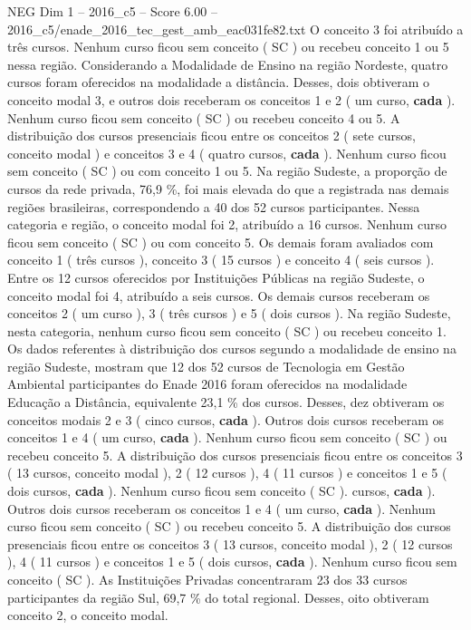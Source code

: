 \begin{textsample}{NEG Dim 1 – 2016\_c5 – Score 6.00 – 2016\_c5/enade\_2016\_tec\_gest\_amb\_eac031fe82.txt}
O conceito 3 foi atribuído a três cursos.
Nenhum curso ficou sem conceito ( SC ) ou recebeu conceito 1 ou 5 nessa região.
Considerando a Modalidade de Ensino na região Nordeste, quatro cursos foram oferecidos na modalidade a distância.
Desses, dois obtiveram o conceito modal 3, e outros dois receberam os conceitos 1 e 2 ( um curso, \textbf{cada} ).
Nenhum curso ficou sem conceito ( SC ) ou recebeu conceito 4 ou 5.
A distribuição dos cursos presenciais ficou entre os conceitos 2 ( sete cursos, conceito modal ) e conceitos 3 e 4 ( quatro cursos, \textbf{cada} ).
Nenhum curso ficou sem conceito ( SC ) ou com conceito 1 ou 5.
Na região Sudeste, a proporção de cursos da rede privada, 76,9 \%, foi mais elevada do que a registrada nas demais regiões brasileiras, correspondendo a 40 dos 52 cursos participantes.
Nessa categoria e região, o conceito modal foi 2, atribuído a 16 cursos.
Nenhum curso ficou sem conceito ( SC ) ou com conceito 5.
Os demais foram avaliados com conceito 1 ( três cursos ), conceito 3 ( 15 cursos ) e conceito 4 ( seis cursos ).
Entre os 12 cursos oferecidos por Instituições Públicas na região Sudeste, o conceito modal foi 4, atribuído a seis cursos.
Os demais cursos receberam os conceitos 2 ( um curso ), 3 ( três cursos ) e 5 ( dois cursos ).
Na região Sudeste, nesta categoria, nenhum curso ficou sem conceito ( SC ) ou recebeu conceito 1.
Os dados referentes à distribuição dos cursos segundo a modalidade de ensino na região Sudeste, mostram que 12 dos 52 cursos de Tecnologia em Gestão Ambiental participantes do Enade 2016 foram oferecidos na modalidade Educação a Distância, equivalente 23,1 \% dos cursos.
Desses, dez obtiveram os conceitos modais 2 e 3 ( cinco cursos, \textbf{cada} ).
Outros dois cursos receberam os conceitos 1 e 4 ( um curso, \textbf{cada} ).
Nenhum curso ficou sem conceito ( SC ) ou recebeu conceito 5.
A distribuição dos cursos presenciais ficou entre os conceitos 3 ( 13 cursos, conceito modal ), 2 ( 12 cursos ), 4 ( 11 cursos ) e conceitos 1 e 5 ( dois cursos, \textbf{cada} ).
Nenhum curso ficou sem conceito ( SC ). cursos, \textbf{cada} ).
Outros dois cursos receberam os conceitos 1 e 4 ( um curso, \textbf{cada} ).
Nenhum curso ficou sem conceito ( SC ) ou recebeu conceito 5.
A distribuição dos cursos presenciais ficou entre os conceitos 3 ( 13 cursos, conceito modal ), 2 ( 12 cursos ), 4 ( 11 cursos ) e conceitos 1 e 5 ( dois cursos, \textbf{cada} ).
Nenhum curso ficou sem conceito ( SC ).
As Instituições Privadas concentraram 23 dos 33 cursos participantes da região Sul, 69,7 \% do total regional.
Desses, oito obtiveram conceito 2, o conceito modal.

\end{textsample}
